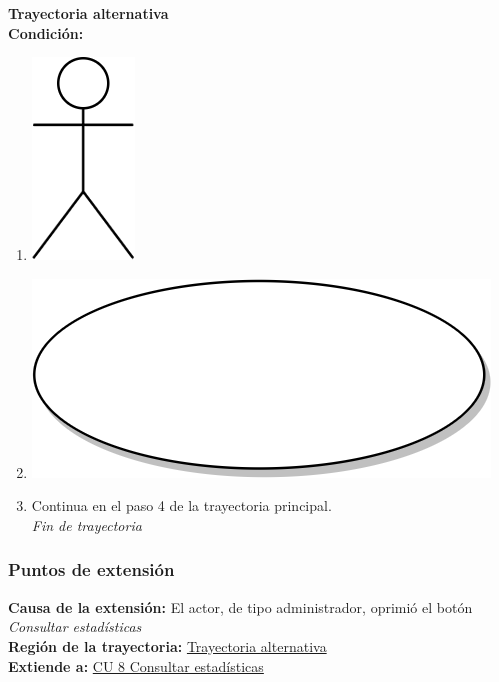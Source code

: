 \textbf{Trayectoria alternativa} \label{cu_ta_} \\
\textbf{Condición:} \\
 \begin{enumerate}[label=\arabic*]
    \item {\includegraphics[scale=.1]{Capitulo3/img/actor.png} }
    \item {\includegraphics[scale=.05]{Capitulo3/img/proceso.png}}
    \item {Continua en el paso 4 de la trayectoria principal.} \\
    \textit{Fin de trayectoria} \\
\end{enumerate}


\subsubsection{Puntos de extensión}
\noindent \textbf{Causa de la extensión:} El actor, de tipo administrador, oprimió el botón \textit{Consultar estadísticas} \\
\textbf{Región de la trayectoria:} \hyperref[cu_ta_]{Trayectoria alternativa } \\
\textbf{Extiende a:} \hyperref[cu8]{CU 8 Consultar estadísticas}
